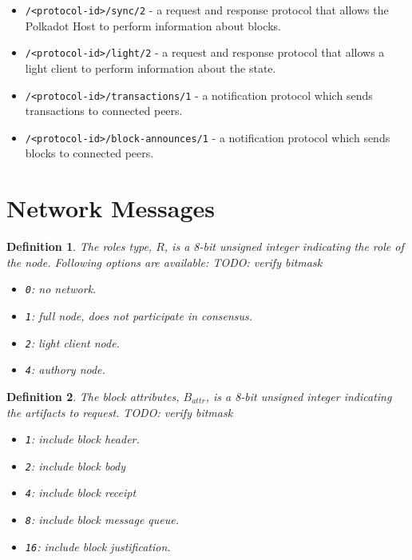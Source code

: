 \documentclass{book}
\newtheorem{definition}{Definition}
\newcommand{\todo}[1]{}
\renewcommand{\todo}[1]{{\color{red} TODO: {#1}}}
\begin{document}
\begin{itemize}
    \item \verb|/<protocol-id>/sync/2| - a request and response protocol that
    allows the Polkadot Host to perform information about blocks.
    \item \verb|/<protocol-id>/light/2| - a request and response protocol that
    allows a light client to perform information about the state.
    \item \verb|/<protocol-id>/transactions/1| - a notification protocol which
    sends transactions to connected peers.
    \item \verb|/<protocol-id>/block-announces/1| - a notification protocol
    which sends blocks to connected peers.
\end{itemize}

\section{Network Messages}

\begin{definition}
    \label{defn-roles}
    The roles type, $R$, is a 8-bit unsigned integer indicating the role of the
    node. Following options are available: \todo{verify bitmask}

    \begin{itemize}
        \item \verb|0|: no network.
        \item \verb|1|: full node, does not participate in consensus.
        \item \verb|2|: light client node.
        \item \verb|4|: authory node.
    \end{itemize}
\end{definition}

\begin{definition}
    \label{defn-block-attributes}
    The block attributes, $B_{attr}$, is a 8-bit unsigned integer indicating the
    artifacts to request. \todo{verify bitmask}

    \begin{itemize}
        \item \verb|1|: include block header.
        \item \verb|2|: include block body
        \item \verb|4|: include block receipt
        \item \verb|8|: include block message queue.
        \item \verb|16|: include block justification.
    \end{itemize}
\end{definition}
\end{document}

